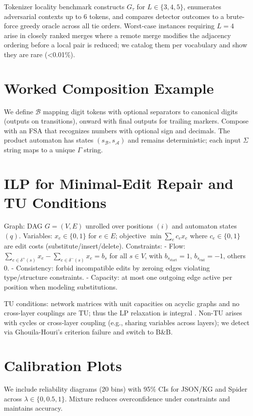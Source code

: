 \documentclass{article}
\begin{document}
Tokenizer locality benchmark constructs $G_\tau$ for $L\in\{3,4,5\}$, enumerates adversarial contexts up to 6 tokens, and compares detector outcomes to a brute-force greedy oracle across all tie orders. Worst-case instances requiring $L=4$ arise in closely ranked merges where a remote merge modifies the adjacency ordering before a local pair is reduced; we catalog them per vocabulary and show they are rare (<0.01\%).

\section{Worked Composition Example}\label{app:worked}
We define $\mathcal{B}$ mapping digit tokens with optional separators to canonical digits (outputs on transitions), onward with final outputs for trailing markers. Compose with an FSA that recognizes numbers with optional sign and decimals. The product automaton has states $(s_{\mathcal{B}}, s_{\mathcal{A}})$ and remains deterministic; each input $\Sigma$ string maps to a unique $\Gamma$ string.

\section{ILP for Minimal-Edit Repair and TU Conditions}\label{app:ilp}
Graph: DAG $G=(V,E)$ unrolled over positions $(i)$ and automaton states $(q)$. Variables: $x_e\in\{0,1\}$ for $e\in E$; objective $\min \sum_{e} c_e x_e$ where $c_e\in\{0,1\}$ are edit costs (substitute/insert/delete). Constraints:
- Flow: $\sum_{e\in\delta^+(s)} x_e - \sum_{e\in\delta^-(s)} x_e = b_s$ for all $s\in V$, with $b_{s_{\mathrm{start}}}=1$, $b_{s_{\mathrm{end}}}=-1$, others 0.
- Consistency: forbid incompatible edits by zeroing edges violating type/structure constraints.
- Capacity: at most one outgoing edge active per position when modeling substitutions.

TU conditions: network matrices with unit capacities on acyclic graphs and no cross-layer couplings are TU; thus the LP relaxation is integral \cite{schrijver1986,nemhauserwolsey1988}. Non-TU arises with cycles or cross-layer coupling (e.g., sharing variables across layers); we detect via Ghouila-Houri’s criterion failure and switch to B\&B.

\section{Calibration Plots}
We include reliability diagrams (20 bins) with 95\% CIs for JSON/KG and Spider across $\lambda\in\{0,0.5,1\}$. Mixture reduces overconfidence under constraints and maintains accuracy.
\end{document}
